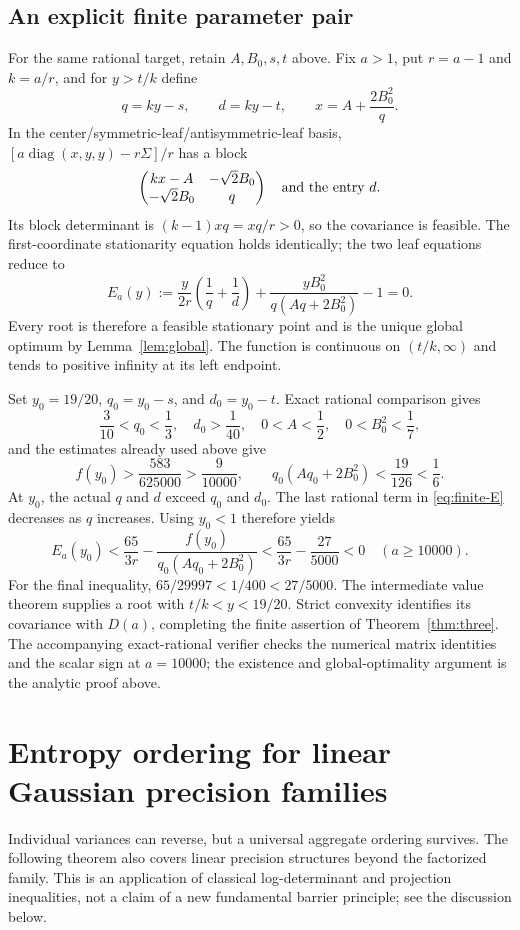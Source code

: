 \documentclass[11pt]{article}
\theoremstyle{remark}\newtheorem{remark}[theorem]{Remark}
\begin{document}
\subsection{An explicit finite parameter pair}
For the same rational target, retain $A,B_0,s,t$ above. Fix $a>1$,
put $r=a-1$ and $k=a/r$, and for $y>t/k$ define
\[
 q=ky-s,\qquad d=ky-t,\qquad x=A+\frac{2B_0^2}{q}.
\]
In the center/symmetric-leaf/antisymmetric-leaf basis,
$[a\operatorname{diag}(x,y,y)-r\Sigma]/r$ has a block
\[
 \begin{pmatrix}kx-A&-\sqrt2B_0\\-\sqrt2B_0&q\end{pmatrix}
 \quad\hbox{and the entry }d.
\]
Its block determinant is $(k-1)xq=xq/r>0$, so the covariance is
feasible. The first-coordinate stationarity equation holds identically;
the two leaf equations reduce to
\begin{equation}\label{eq:finite-E}
 E_a(y):=\frac{y}{2r}\left(\frac1q+\frac1d\right)
 +\frac{yB_0^2}{q(Aq+2B_0^2)}-1=0.
\end{equation}
Every root is therefore a feasible stationary point and is the unique
global optimum by Lemma~\ref{lem:global}. The function is continuous on
$(t/k,\infty)$ and tends to positive infinity at its left endpoint.

Set $y_0=19/20$, $q_0=y_0-s$, and $d_0=y_0-t$.
Exact rational comparison gives
\[
 \frac3{10}<q_0<\frac13,\quad d_0>\frac1{40},\quad
 0<A<\frac12,\quad 0<B_0^2<\frac17,
\]
and the estimates already used above give
\[
 f(y_0)>\frac{583}{625000}>\frac9{10000},\qquad
 q_0(Aq_0+2B_0^2)<\frac{19}{126}<\frac16 .
\]
At $y_0$, the actual $q$ and $d$ exceed $q_0$ and $d_0$.
The last rational term in \eqref{eq:finite-E} decreases as $q$ increases.
Using $y_0<1$ therefore yields
\[
 E_a(y_0)
 <\frac{65}{3r}
   -\frac{f(y_0)}{q_0(Aq_0+2B_0^2)}
 <\frac{65}{3r}-\frac{27}{5000}<0
 \quad(a\ge10000).
\]
For the final inequality, $65/29997<1/400<27/5000$.
The intermediate value theorem supplies a root with
$t/k<y<19/20$. Strict convexity identifies its covariance with
$D(a)$, completing the finite assertion of Theorem~\ref{thm:three}.
The accompanying exact-rational verifier checks the numerical matrix
identities and the scalar sign at $a=10000$; the existence and
global-optimality argument is the analytic proof above.

\section{Entropy ordering for linear Gaussian precision families}
Individual variances can reverse, but a universal aggregate ordering
survives. The following theorem also covers linear precision structures
beyond the factorized family. This is an application of classical
log-determinant and projection inequalities, not a claim of a new
fundamental barrier principle; see the discussion below.
\end{document}
